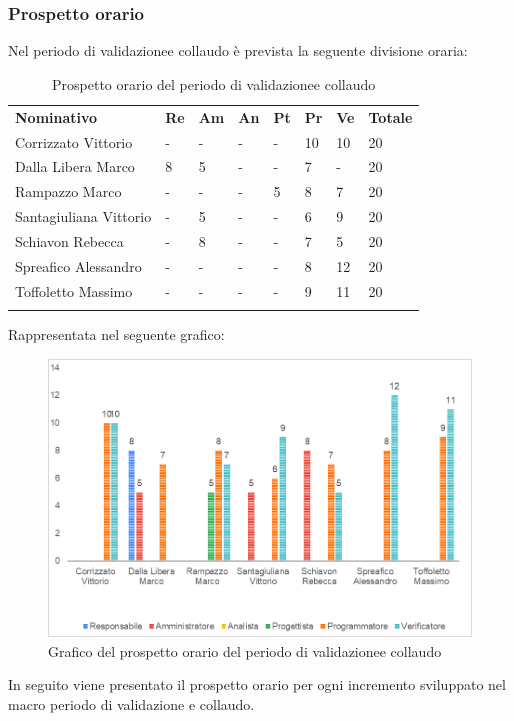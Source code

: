 \subsubsection{Prospetto orario}
Nel periodo di validazione\glosp e collaudo è prevista la seguente divisione oraria:
\begin{longtable} {				
		>{}p{40mm}  
		>{}p{8mm}
		>{}p{8mm}
		>{}p{8mm}
		>{}p{8mm}
		>{}p{8mm}
		>{}p{8mm}
		>{}p{12mm}			
	}			
	\rowcolor{gray!50}
	\textbf{Nominativo} & \textbf{Re} & \textbf{Am} & \textbf{An} & \textbf{Pt} & \textbf{Pr} & \textbf{Ve} & \textbf{Totale}	\TBstrut \\ [2mm]
	Corrizzato Vittorio & - & - & - & - & 10 & 10 & 20 \TBstrut \\ [2mm]
	Dalla Libera Marco & 8 & 5 & - & - & 7 & - & 20 \TBstrut \\ [2mm]
	Rampazzo Marco & - & - & - & 5 & 8 & 7 & 20 \TBstrut \\ [2mm]
	Santagiuliana Vittorio & - & 5 & - & - & 6 & 9 & 20 \TBstrut \\ [2mm]
	Schiavon Rebecca & - & 8 & - & - & 7 & 5 & 20 \TBstrut \\ [2mm]
	Spreafico Alessandro & - & - & - & - & 8 & 12 & 20 \TBstrut \\ [2mm]
	Toffoletto Massimo & - & - & - & - & 9 & 11 & 20 \TBstrut \\ [2mm]
	\rowcolor{white}
	\caption{Prospetto orario del periodo di validazione\glosp e collaudo}
\end{longtable}
Rappresentata nel seguente grafico:
\begin{figure} [H]
	\includegraphics[width=\linewidth]{./img/Grafici/7.png}
	\caption{Grafico del prospetto orario del periodo di validazione\glosp e collaudo}
\end{figure}
In seguito viene presentato il prospetto orario per ogni incremento sviluppato nel macro periodo di validazione e collaudo.
